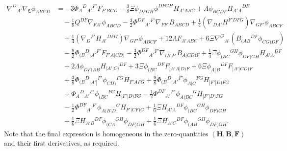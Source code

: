 \documentclass[10pt,a4paper]{article}
\theoremstyle{plain}
\def\bmB{{\bm B}}
\def\bmF{{\bm F}}
\def\bmH{{\bm H}}
\begin{document}
\begin{align}
\nabla^D{}_{A'}\nabla_{\bm\xi}\phi_{ABCD}  &= -3 \Phi _{A}{}^{D}{}_{A'}{}^{F'} F_{F'BCD}  - \tfrac{3}{8} \Xi  \phi _{DFGH} \phi ^{DFGH} H_{A'ABC} + \Lambda  \phi _{BCDF} H_{A'A}{}^{DF} \nonumber\\ 
    & \quad- \tfrac{1}{8} Q^{DF} \nabla_{FA'}\phi _{ABCD}   - \tfrac{3}{2} \Phi ^{DF}{}_{A'}{}^{F'} \nabla_{FF'}B_{ABCD} + \tfrac{1}{4} (\nabla_{DA'}H^{F'DFG}) \nabla_{GF'}\phi _{ABCF} \nonumber\\
    &\quad + \tfrac{1}{4} (\nabla_{D}{}^{F'}H_{A'}{}^{DFG}) \nabla_{GF'}\phi _{ABCF}  + 12 \Lambda  F_{A'ABC} +6\Xi \nabla^G{}_{A'}\left( B_{(AB}{}^{DF}\phi_{CG)DF}\right) \nonumber \\
    &\quad - \tfrac{9}{2} \Phi _{(B}{}^{D}{}_{|A'}{}^{F'}F_{F'A|CD)}  - \tfrac{3}{2} \Phi ^{DF}{}_{A'}{}^{F'}\nabla_{(B|F'}B_{A|CD)F} + \tfrac{1}{4} \Xi  \phi _{(BC}{}^{GH}\phi _{DF)GH} H_{A'A}{}^{DF}  \nonumber\\
    &\quad+ 2 \Lambda  \phi_{DF(AB}H_{\vert A'\vert C)}{}^{DF}+ 3 \Xi  \phi _{(BC}{}^{DF}F_{|A'A|D)F} + 6 \Xi  \phi _{A(B}{}^{DF}F_{|A'|CD)F} \nonumber \\
    &\quad  + \tfrac{3}{8} \Phi _{(B}{}^{D}{}_{|A'|}{}^{F'}\phi _{CD)}{}^{FG}H_{F'AFG} + \tfrac{9}{8} \Phi _{(B}{}^{D}{}_{|A'}{}^{F'}\phi _{A|C}{}^{FG}H_{|F'|D)FG} \nonumber\\
    &\quad + \Phi _{A}{}^{D}{}_{A'}{}^{F'}\phi _{(BC}{}^{FG}H_{|F'|D)FG}  - \tfrac{1}{2} \Phi ^{DF}{}_{A'}{}^{F'}\phi _{A(BC}{}^{G}H_{|F'|D)FG} \nonumber \\
    &\quad  - \tfrac{1}{2} \Phi ^{DF}{}_{A'}{}^{F'}\phi _{A(B|D}{}^{G}H_{F'|CF)G}+ \tfrac{1}{6}\Xi H_{A'A}{}^{DF}\phi_{(BC}{}^{GH}\phi_{DF)GH} \nonumber\\
    &\quad + \tfrac{1}{6}\Xi H_{A'B}{}^{DF}\phi_{(CA}{}^{GH}\phi_{DF)GH} + \tfrac{1}{6}\Xi H_{A'C}{}^{DF}\phi_{(AB}{}^{GH}\phi_{DF)GH}. \label{Eq:CollineationIdentity}
\end{align}
Note that the final expression is homogeneous in the zero-quantities
$(\bmH, \bmB,\bmF)$ and their first derivatives, as required.\\
\end{document}
